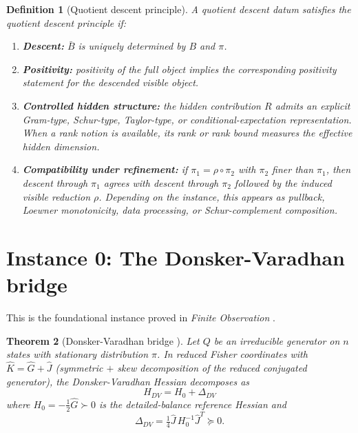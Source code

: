 \documentclass[11pt,a4paper]{article}
\numberwithin{equation}{section}
\theoremstyle{thmcompact}
\newtheorem{theorem}{Theorem}[section]
\newtheorem{definition}[theorem]{Definition}
\theoremstyle{remark}
\begin{document}
\begin{definition}[Quotient descent principle]\label{def:qdp}
A quotient descent datum satisfies the \emph{quotient descent principle} if:
\begin{enumerate}[label=(QDP\arabic*)]
\item \textbf{Descent:} $\bar{B}$ is uniquely determined by $B$ and $\pi$.
\item \textbf{Positivity:} positivity of the full object implies the corresponding positivity statement for the descended visible object.
\item \textbf{Controlled hidden structure:} the hidden contribution $R$ admits an explicit Gram-type, Schur-type, Taylor-type, or conditional-expectation representation. When a rank notion is available, its rank or rank bound measures the effective hidden dimension.
\item \textbf{Compatibility under refinement:} if $\pi_1 = \rho \circ \pi_2$ with $\pi_2$ finer than $\pi_1$, then descent through $\pi_1$ agrees with descent through $\pi_2$ followed by the induced visible reduction $\rho$. Depending on the instance, this appears as pullback, Loewner monotonicity, data processing, or Schur-complement composition.
\end{enumerate}
\end{definition}

\section{Instance 0: The Donsker-Varadhan bridge}
\label{sec:finite-bridge}

This is the foundational instance proved in \emph{Finite Observation} \cite{Dunkley2026}.

\begin{theorem}[Donsker-Varadhan bridge {\cite[Theorem~3.2]{Dunkley2026}}]
\label{thm:dv-bridge}
Let $Q$ be an irreducible generator on $n$ states with stationary distribution $\pi$. In reduced Fisher coordinates with $\widehat{K} = \widehat{G} + \widehat{J}$ (symmetric $+$ skew decomposition of the reduced conjugated generator), the Donsker-Varadhan Hessian decomposes as
\[
H_{DV} = H_0 + \Delta_{DV}
\]
where $H_0 = -\tfrac{1}{2}\widehat{G} \succ 0$ is the detailed-balance reference Hessian and
\[
\Delta_{DV} = \tfrac{1}{4}\widehat{J}\,H_0^{-1}\widehat{J}^T \succeq 0.
\]
\end{theorem}
\end{document}
